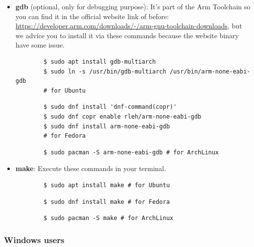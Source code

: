 \begin{itemize}
    \item \textbf{gdb} (optional, only for debugging purpose): It's part of the Arm Toolchain so you can find it in the official website link of before: \url{https://developer.arm.com/downloads/-/arm-gnu-toolchain-downloads}, but we advice you to install it via these commands because the website binary have some issue.
    \begin{verbatim}
        $ sudo apt install gdb-multiarch
        $ sudo ln -s /usr/bin/gdb-multiarch /usr/bin/arm-none-eabi-gdb
        # for Ubuntu
    \end{verbatim}
    \begin{verbatim}
        $ sudo dnf install 'dnf-command(copr)'
        $ sudo dnf copr enable rleh/arm-none-eabi-gdb
        $ sudo dnf install arm-none-eabi-gdb 
        # for Fedora
    \end{verbatim}
    \begin{verbatim}
        $ sudo pacman -S arm-none-eabi-gdb # for ArchLinux
    \end{verbatim}

    \item \textbf{make}: Execute these commands in your terminal.
    \begin{verbatim}
        $ sudo apt install make # for Ubuntu
    \end{verbatim}
    \begin{verbatim}
        $ sudo dnf install make # for Fedora
    \end{verbatim}
    \begin{verbatim}
        $ sudo pacman -S make # for ArchLinux
    \end{verbatim}

  \end{itemize}  
\subsubsection{ Windows users} 

